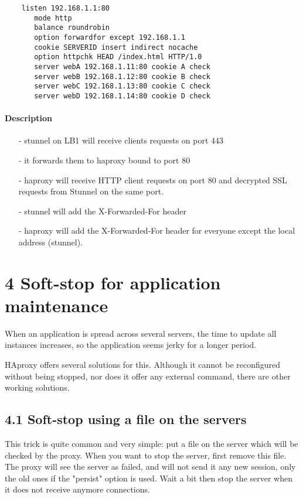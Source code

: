 \begin{verbatim}
    listen 192.168.1.1:80
       mode http
       balance roundrobin
       option forwardfor except 192.168.1.1
       cookie SERVERID insert indirect nocache
       option httpchk HEAD /index.html HTTP/1.0
       server webA 192.168.1.11:80 cookie A check
       server webB 192.168.1.12:80 cookie B check
       server webC 192.168.1.13:80 cookie C check
       server webD 192.168.1.14:80 cookie D check
\end{verbatim}

\paragraph{Description}

\begin{itemize}
\item[-] stunnel on LB1 will receive clients requests on port 443
\item[-] it forwards them to haproxy bound to port 80
\item[-] haproxy will receive HTTP client requests on port 80 and decrypted SSL
   requests from Stunnel on the same port.
\item[-] stunnel will add the X-Forwarded-For header
\item[-] haproxy will add the X-Forwarded-For header for everyone except the local
   address (stunnel).
\end{itemize}

\section{4 Soft-stop for application maintenance}

When an application is spread across several servers, the time to update all
instances increases, so the application seems jerky for a longer period.

HAproxy offers several solutions for this. Although it cannot be reconfigured
without being stopped, nor does it offer any external command, there are other
working solutions.

\subsection{4.1 Soft-stop using a file on the servers}

This trick is quite common and very simple: put a file on the server which will
be checked by the proxy. When you want to stop the server, first remove this
file. The proxy will see the server as failed, and will not send it any new
session, only the old ones if the "persist" option is used. Wait a bit then
stop the server when it does not receive anymore connections.

